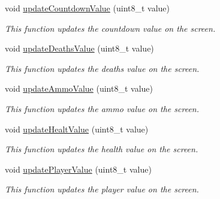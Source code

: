 \begin{DoxyCompactItemize}
\mbox{\label{class_display_control_a7a566545dbdd6834307d27de99a221d6}} 
void \mbox{\hyperlink{class_display_control_a7a566545dbdd6834307d27de99a221d6}{update\+Countdown\+Value}} (uint8\+\_\+t value)
\begin{DoxyCompactList}\small\item\em This function updates the countdown value on the screen. \end{DoxyCompactList}\item 
\mbox{\label{class_display_control_a6bb416767f43144827fa5bf6ecece4a9}} 
void \mbox{\hyperlink{class_display_control_a6bb416767f43144827fa5bf6ecece4a9}{update\+Deaths\+Value}} (uint8\+\_\+t value)
\begin{DoxyCompactList}\small\item\em This function updates the deaths value on the screen. \end{DoxyCompactList}\item 
\mbox{\label{class_display_control_aa54c7b984287e6a694ea83a3cb3d8ece}} 
void \mbox{\hyperlink{class_display_control_aa54c7b984287e6a694ea83a3cb3d8ece}{update\+Ammo\+Value}} (uint8\+\_\+t value)
\begin{DoxyCompactList}\small\item\em This function updates the ammo value on the screen. \end{DoxyCompactList}\item 
\mbox{\label{class_display_control_a1d61b517063ca3f3dd36d2b7eb3ef909}} 
void \mbox{\hyperlink{class_display_control_a1d61b517063ca3f3dd36d2b7eb3ef909}{update\+Healt\+Value}} (uint8\+\_\+t value)
\begin{DoxyCompactList}\small\item\em This function updates the health value on the screen. \end{DoxyCompactList}\item 
\mbox{\label{class_display_control_ad6107e04362c907da6a64b73bcc9e795}} 
void \mbox{\hyperlink{class_display_control_ad6107e04362c907da6a64b73bcc9e795}{update\+Player\+Value}} (uint8\+\_\+t value)
\begin{DoxyCompactList}\small\item\em This function updates the player value on the screen. \end{DoxyCompactList}\item 

\end{DoxyCompactItemize}
